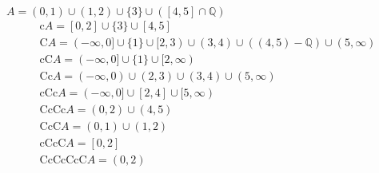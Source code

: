\documentclass{article}
\begin{document}
$A=(0,1)\cup (1,2)\cup \{3\}\cup([4,5]\cap\mathbb{Q})$
\begin{eqnarray}
\text{c} A=[0,2]\cup \{3\}\cup[4,5]\\
\text{C}A=(-\infty,0]\cup \{1\}\cup[2,3)\cup (3,4)\cup((4,5)-\mathbb{Q})\cup(5,\infty)\\
\text{cC}A=(-\infty,0]\cup \{1\}\cup[2,\infty)\\
\text{Cc} A=(-\infty,0)\cup (2,3)\cup (3,4)\cup(5,\infty)\\
\text{cCc} A=(-\infty,0]\cup [2,4]\cup[5,\infty)\\
\text{CcCc} A=(0,2)\cup (4,5)\\
\text{CcC} A=(0,1)\cup (1,2)\\
\text{cCcC} A=[0,2]\\
\text{CcCcCcC} A=(0,2)
\end{eqnarray}
\end{document}
